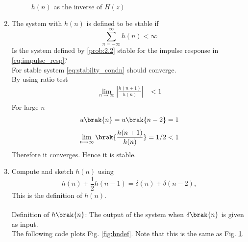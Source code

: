\documentclass[journal,12pt,twocolumn]{IEEEtran}
\theoremstyle{remark}
\begin{document}
\begin{enumerate}[label=\thesection.\arabic*]
\begin{figure}[H]
			\caption{$h(n)$ as the inverse of $H(z)$}
			\label{fig:hn}
		\end{figure}
	\item The system with $h(n)$ is defined to be stable if
		\begin{equation}
			\sum_{n=-\infty}^{\infty}h(n) < \infty \label{eq:stabilty_condn}
		\end{equation}
		Is the system defined by \eqref{prob:2.2} stable for the impulse response in \eqref{eq:impulse_resp}?\\
		\solution For stable system \eqref{eq:stabilty_condn} should converge.\\
		By using ratio test
		\begin{align}
			    \lim_{n \to \infty}\left|\frac{h(n + 1)}{h(n)}\right|&<1 \\
		\end{align}
		For large $n$ 
		\begin{align}
			    u\brak{n}=u\brak{n-2}=1
		\end{align}
		\begin{align}
			  \lim_{n \to \infty}  \brak{\frac{h(n + 1)}{h(n)}} = 1/2 <1
		\end{align}
		Therefore it converges. Hence it is stable.
	\item 
		Compute and sketch $h(n)$ using 
		\begin{equation}
			\label{eq:iir_filter_h}
			h(n) + \frac{1}{2}h(n-1) = \delta(n) + \delta(n-2), 
		\end{equation}
		This is the definition of $h(n)$.
		\\
		\solution\\
		Definition of $h\brak{n}$: The output of the system when $\delta\brak{n}$ is given as input.\\

		The following code plots Fig. \ref{fig:hndef}. Note that this is the same as Fig. 
		\ref{fig:hn}. 


\end{enumerate}
\end{document}
